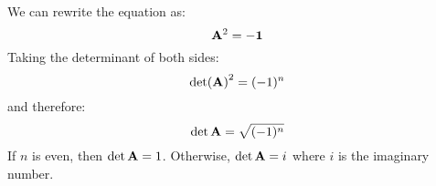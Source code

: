 \begin{sol}
    We can rewrite the equation as:
    \begin{equation}
        \mathbf{A}^2 = -\mathbf{1}
    \end{equation}
    Taking the determinant of both sides:
    \begin{equation}
        \det(\mathbf{A})^2 = (-1)^n
    \end{equation}
    and therefore:
    \begin{equation}
        \det \mathbf{A} = \sqrt{(-1)^n}
    \end{equation}
    If $n$ is even, then $\det \mathbf{A} = 1$. Otherwise, $\det \mathbf{A} = i$ where $i$ is the imaginary number.
\end{sol}
